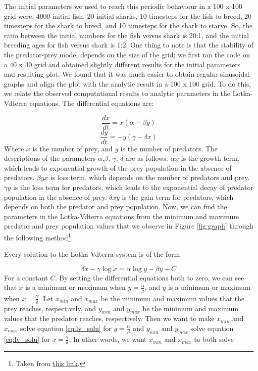 \documentclass{article}
\begin{document}
The initial parameters we used to reach this periodic behaviour in a 100 x 100 grid were: 4000 initial fish, 20 initial sharks, 10 timesteps for the fish to breed, 20 timesteps for the shark to breed, and 10 timesteps for the shark to starve. So, the ratio between the initial numbers for the fish versus shark is 20:1, and the initial breeding ages for fish versus shark is 1:2. One thing to note is that the stability of the predator-prey model depends on the size of the grid; we first ran the code on a 40 x 40 grid and obtained slightly different results for the initial parameters and resulting plot. We found that it was much easier to obtain regular sinusoidal graphs and align the plot with the analytic result in a 100 x 100 grid. To do this, we relate the observed computational results to analytic parameters in the Lotka-Vdterra equations. The differential equations are:\par
\begin{equation}
\frac{dx}{dt} = x(\alpha - \beta y)
\label{eq:lv1}
\end{equation}
\begin{equation}
\frac{dy}{dt} = -y(\gamma - \delta x)
\label{eq:lv2}
\end{equation}
Where $x$ is the number of prey, and $y$ is the number of predators. The descriptions of the parameters $\alpha$,$\beta$, $\gamma$, $\delta$ are as follows: $\alpha x$ is the growth term, which leads to exponential growth of the prey population in the absence of predators. $\beta yx$ is loss term, which depends on the number of predators and prey. $\gamma y$ is the loss term for predators, which leads to the exponential decay of predator population in the absence of prey. $\delta xy$ is the gain term for predators, which depends on both the predator and prey population. Now, we can find the parameters in the Lotka-Vdterra equations from the minimum and maximum predator and prey population values that we observe in Figure \ref{fig:graph} through the following method\footnote{Taken from \href{http://math.stackexchange.com/q/1853938}{this link}.}.\par
Every solution to the Lotka-Vdterra system is of the form\par
\begin{equation}
\delta x - \gamma \log x = \alpha \log y - \beta y + C
\label{eq:lv_solu}
\end{equation}
\noindent For a constant $C$. By setting the differential equations both to zero, we can see that $x$ is a minimum or maximum when $y = \frac{\alpha}{\beta}$, and $y$ is a minimum or maximum when $x = \frac{\gamma}{\delta}$. Let $x_{min}$ and $x_{max}$ be the minimum and maximum values that the prey reaches, respectively, and $y_{min}$ and $y_{max}$ be the minimum and maximum values that the predator reaches, respectively. Then we want to make $x_{min}$ and $x_{max}$ solve equation \ref{eq:lv_solu} for $y = \frac{\alpha}{\beta}$ and $y_{min}$ and $y_{max}$ solve equation \ref{eq:lv_solu} for $x = \frac{\gamma}{\delta}$. In other words, we want $x_{min}$ and $x_{max}$ to both solve
\end{document}
